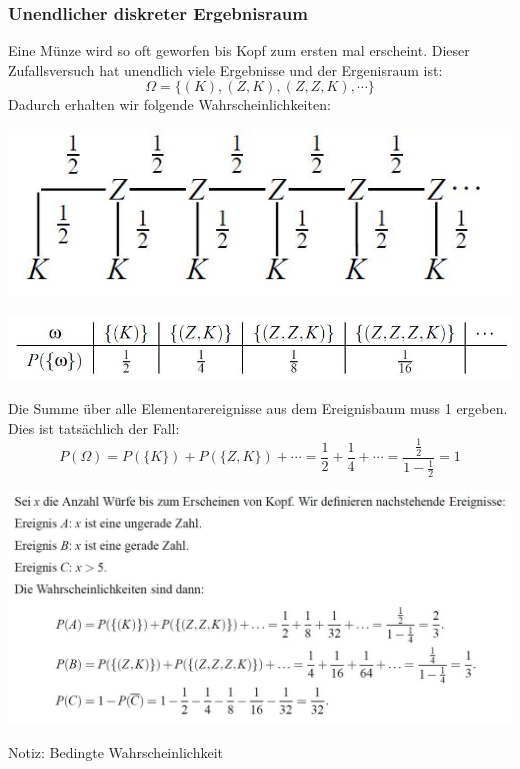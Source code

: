 \documentclass[12pt,a4paper]{article} %
\begin{document}
\subsubsection{Unendlicher diskreter Ergebnisraum}

Eine Münze wird so oft geworfen bis Kopf zum ersten mal erscheint. Dieser Zufallsversuch hat unendlich viele Ergebnisse und der Ergenisraum	ist:
$$\Omega = \{(K), (Z,K), (Z,Z,K), \cdots \}$$
Dadurch erhalten wir folgende Wahrscheinlichkeiten:
\begin{center}
\includegraphics[scale=0.5]{muenzbaum.jpg}
\end{center}
\begin{center}
\includegraphics[scale=0.5]{muenzwahrsch.jpg}
\end{center}
Die Summe über alle Elementarereignisse aus dem Ereignisbaum muss 1 ergeben. Dies ist tatsächlich der Fall:
$$P(\Omega) = P (\{K\})+P(\{Z,K\})+\cdots = \frac{1}{2}+\frac{1}{4}+\cdots = \frac{\frac{1}{2}}{1-\frac{1}{2}} = 1$$
\begin{center}
\includegraphics[scale=0.4]{muenzbsp.jpg}
\end{center}

Notiz: Bedingte Wahrscheinlichkeit
\end{document}
